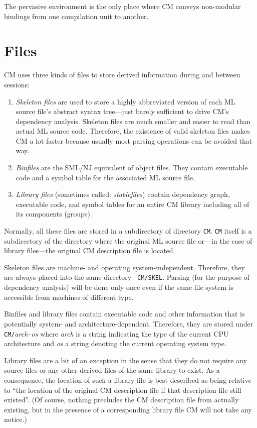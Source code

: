\documentclass{article}
\begin{document}
The pervasive environment is the only place where CM conveys
non-modular bindings from one compilation unit to another.

\section{Files}

CM uses three kinds of files to store derived information during and
between sessions:

\begin{enumerate}
\item {\it Skeleton files} are used to store a highly abbreviated
version of each ML source file's abstract syntax tree---just barely
sufficient to drive CM's dependency analysis.  Skeleton files are much
smaller and easier to read than actual ML source code.  Therefore, the
existence of valid skeleton files makes CM a lot faster because
usually most parsing operations can be avoided that way.
\item {\it Binfiles} are the SML/NJ equivalent of object files.  They
contain executable code and a symbol table for the associated ML
source file.
\item {\it Library files} (sometimes called: {\em stablefiles}) contain
dependency graph, executable code, and symbol tables for an entire CM
library including all of its components (groups).
\end{enumerate}

Normally, all these files are stored in a subdirectory of directory
{\tt CM}. {\tt CM} itself is a subdirectory of the directory where the
original ML source file or---in the case of library files---the
original CM description file is located.

Skeleton files are machine- and operating system-independent.
Therefore, they are always placed into the same directory {\tt
CM/SKEL}. Parsing (for the purpose of dependency analysis) will be
done only once even if the same file system is accessible from
machines of different type.

Binfiles and library files contain executable code and other
information that is potentially system- and architecture-dependent.
Therefore, they are stored under {\tt CM/}{\it arch}{\tt -}{\it os}
where {\it arch} is a string indicating the type of the current
CPU architecture and {\it os} a string denoting the current operating
system type.

Library files are a bit of an exception in the sense that they do not
require any source files or any other derived files of the same
library to exist.  As a consequence, the location of such a library
file is best described as being relative to ``the location of the
original CM description file if that description file still existed''.
(Of course, nothing precludes the CM description file from actually
existing, but in the presence of a corresponding library file CM will
not take any notice.)
\end{document}

